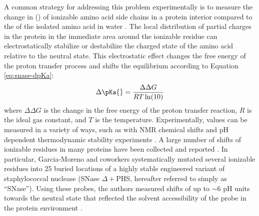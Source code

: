 A common strategy for addressing this problem experimentally is to measure the change in \pKa{} (\dpKa{}) of ionizable amino acid side chains in a protein interior compared to the \pKa{} of the isolated amino acid in water \cite{Bradbury1966, Forsyth2002, Isom2010, Langsetmo1991, Markley1975}. 
The local distribution of partial charges in the protein in the immediate area around the ionizable residue can electrostatically stabilize or destabilize the charged state of the amino acid relative to the neutral state. 
This electrostatic effect changes the free energy of the proton transfer process and shifts the equilibrium according to Equation \ref{eq:snase-dpKa}:
\begin{equation}
    \Delta \pKa{} = \frac{\Delta \Delta G}{R T \ln(10)}
\label{eq:snase-dpKa}
\end{equation}
where $\Delta \Delta G$ is the change in the free energy of the proton transfer reaction, $R$ is the ideal gas constant, and $T$ is the temperature. 
Experimentally, \dpKa{} values can be measured in a variety of ways, such as with NMR chemical shifts and pH dependent thermodynamic stability experiments \cite{Bradbury1966, Markley1975, Isom2008}. 
A large number of \pKa{} shifts of ionizable residues in  many proteins have been collected and reported \cite{Grimsley2009}. 
In particular, Garcia-Moreno and coworkers systematically mutated several ionizable residues into 25 buried locations of a highly stable engineered variant of staphylococcal nuclease (SNase $\Delta+$PHS, hereafter referred to simply as ``SNase''). 
Using these \pKa{} probes, the authors measured shifts of up to $\sim$6 pH units towards the neutral state that reflected the solvent accessibility of the probe in the protein environment \cite{Isom2010, Isom2008, Harms2009, Isom2011}. 

